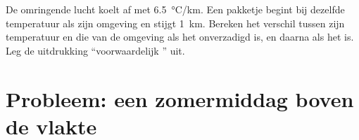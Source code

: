 \begin{exercise}[$\star\star\star$]\label{exo:g10:why-clouds-form:15}
De omringende lucht koelt af met \qty{6.5}{\degreeCelsius/km}. Een pakketje
begint bij dezelfde temperatuur als zijn omgeving en stijgt \qty{1}{km}. Bereken
het verschil tussen zijn temperatuur en die van de omgeving als het onverzadigd
is, en daarna als het  is. Leg de uitdrukking ``voorwaardelijk
'' uit.
\end{exercise}

\section{Probleem: een zomermiddag boven de vlakte}

